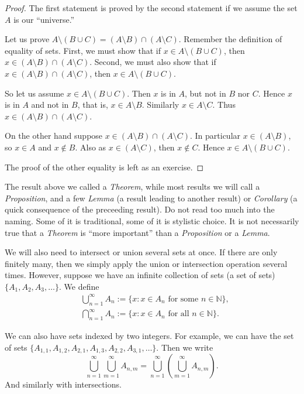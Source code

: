 \documentclass[12pt]{book}
\newcommand{\N}{{\mathbb{N}}}
\theoremstyle{plain}
\theoremstyle{remark}
\theoremstyle{definition}
\theoremstyle{exercise}
\theoremstyle{example}
\begin{document}
\begin{proof}
The first statement is proved by the second statement if we
assume the set $A$ is our ``universe.''

Let us prove $A \setminus (B \cup C) = (A \setminus B) \cap (A \setminus C)$.
Remember the definition of equality of sets.  First, we must show that
if $x \in A \setminus (B \cup C)$, then
$x \in (A \setminus B) \cap (A \setminus C)$.  Second, we must also show that
if $x \in (A \setminus B) \cap (A \setminus C)$, then
$x \in A \setminus (B \cup C)$.

So let us assume $x \in A \setminus (B \cup C)$.  Then $x$ is in 
$A$, but not in $B$ nor $C$.  Hence $x$ is in $A$ and not in $B$, that is,
$x \in A \setminus B$.  Similarly $x \in A \setminus C$.  Thus
$x \in (A \setminus B) \cap (A \setminus C)$.

On the other hand suppose 
$x \in (A \setminus B) \cap (A \setminus C)$.  In particular
$x \in (A \setminus B)$, so 
$x \in A$ and $x \notin B$.  Also as $x \in (A \setminus C)$, then $x \notin C$.
Hence $x \in A \setminus (B \cup C)$.

The proof of the other equality is left as an exercise.
\end{proof}

The result above we called a \emph{Theorem}, while most results we will call
a \emph{Proposition}, and a few \emph{Lemma} (a result leading to another result) or
\emph{Corollary} (a quick consequence of the preceeding result).  Do not read too much into
the naming.  Some of it is traditional, some of it is stylistic choice.
It is not necessarily true that a \emph{Theorem} is ``more important'' than a
\emph{Proposition} or a \emph{Lemma}.

We will also need to intersect or union several sets at once.  If there are
only finitely many, then we simply apply the union or intersection operation
several times.  However, suppose we have an infinite collection
of sets (a set of sets)
$\{ A_1, A_2, A_3, \ldots \}$.  We define
\begin{align*}
& \bigcup_{n=1}^\infty A_n := \{ x : x \in A_n \text{ for some $n \in \N$}
\} , \\
& \bigcap_{n=1}^\infty A_n := \{ x : x \in A_n \text{ for all $n \in \N$}
\} .
\end{align*}

We can also have sets indexed by two integers.  For example, we can have
the set of sets
$\{ A_{1,1}, A_{1,2}, A_{2,1}, A_{1,3}, A_{2,2}, A_{3,1}, \ldots \}$.  Then
we write 
\begin{equation*}
\bigcup_{n=1}^\infty \bigcup_{m=1}^\infty A_{n,m}
=
\bigcup_{n=1}^\infty \left( \bigcup_{m=1}^\infty A_{n,m} \right) .
\end{equation*}
And similarly with intersections.
\end{document}
